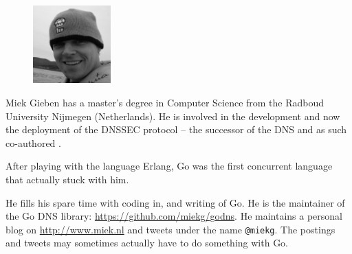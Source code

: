 \begin{figure}
  \begin{center}
  \includegraphics[width=3cm]{fig/avatar-miekg-300x300}
  \end{center}
\end{figure}
Miek Gieben has a master's degree in Computer Science from the Radboud University Nijmegen (Netherlands).
He is involved in the development and now the deployment of the DNSSEC protocol --
the successor of the DNS and as such co-authored \cite{RFC4641}.

After playing with the language Erlang, Go was the first concurrent language
that actually stuck with him.

He fills his spare time with coding in, and writing of Go. He is the maintainer
of the Go DNS library: \url{https://github.com/miekg/godns}.
He maintains a personal blog on \url{http://www.miek.nl} and tweets
under the name \texttt{@miekg}. The postings and tweets may sometimes 
actually have to do something with Go.
